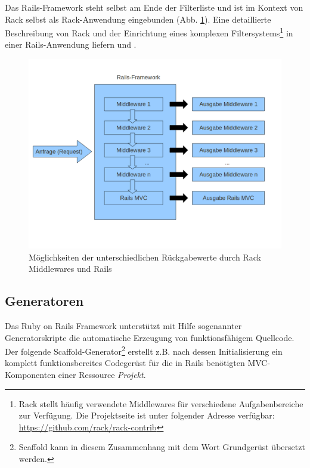 %
Das Rails-Framework steht selbst am Ende der Filterliste und ist im Kontext von Rack selbst als Rack-Anwendung eingebunden (Abb. \ref{rackmiddlewares}). Eine detaillierte Beschreibung von Rack und der Einrichtung eines komplexen Filtersystems\footnote{Rack stellt häufig verwendete Middlewares für verschiedene Aufgabenbereiche zur Verfügung. Die Projektseite ist unter folgender Adresse verfügbar: \href{https://github.com/rack/rack-contrib}{https://github.com/rack/rack-contrib}} in einer Rails-Anwendung liefern \cite{rack} und \cite{railsguiderack}.
\begin{figure}[!ht]
\begin{center}
\includegraphics[scale=0.5]{images/rack/middlewares.png}
\caption{Möglichkeiten der unterschiedlichen Rückgabewerte durch Rack Middlewares und Rails}
\label{rackmiddlewares}
\end{center}
\end{figure}
\subsection{Generatoren}
\label{sec:railsgeneratoren}
Das Ruby on Rails Framework unterstützt mit Hilfe sogenannter Generatorskripte die automatische Erzeugung von funktionsfähigem Quellcode. Der folgende Scaffold-Generator\footnote{Scaffold kann in diesem Zusammenhang mit dem Wort Grundgerüst übersetzt werden.} erstellt z.B. nach dessen Initialisierung ein komplett funktionsbereites Codegerüst für die in Rails benötigten MVC-Komponenten einer Ressource \emph{Projekt}.

